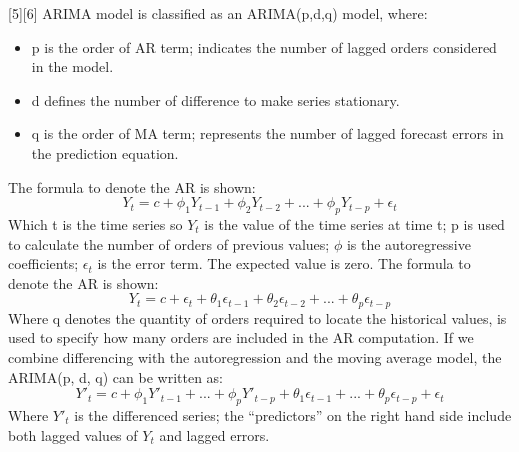 \documentclass{ieeeojies}
\begin{document}
[5][6] ARIMA model is classified as an ARIMA(p,d,q) model, where:
\begin{itemize}
    \item p is the order of AR term; indicates the number of lagged orders considered in the model.
    \item d defines the number of difference to make series stationary.
    \item q is the order of MA term; represents the number of lagged forecast errors in the prediction equation.
\end{itemize}
The formula to denote the AR is shown:
\[ Y_t = c + \phi_1 Y_{t-1} + \phi_2 Y_{t-2} +...+ \phi_p Y_{t-p} + \epsilon_t\]
Which t is the time series so \(Y_t\) is the value of the time series at time t; p is used to calculate the number of orders of previous values; \(\phi\) is the autoregressive coefficients; \(\epsilon_t\) is the error term. The expected value is zero. 
The formula to denote the AR is shown:
\[ Y_t = c + \epsilon_t + \theta_1 \epsilon_{t-1} + \theta_2 \epsilon_{t-2} +...+ \theta_p  \epsilon_{t-p}\]
Where q denotes the quantity of orders required to locate the historical values, is used to specify how many orders are included in the AR computation. If we combine differencing with the autoregression and the moving average model, the ARIMA(p, d, q) can be written as:
\[ Y'_t = c + \phi_1 Y'_{t-1} +...+ \phi_p Y'_{t-p} + \theta_1 \epsilon_{t-1} +...+ \theta_p  \epsilon_{t-p} + \epsilon_t\]
Where \(Y'_t\) is the differenced series; the “predictors” on the right hand side include both lagged values of  \(Y_t\) and lagged errors.
\end{document}

